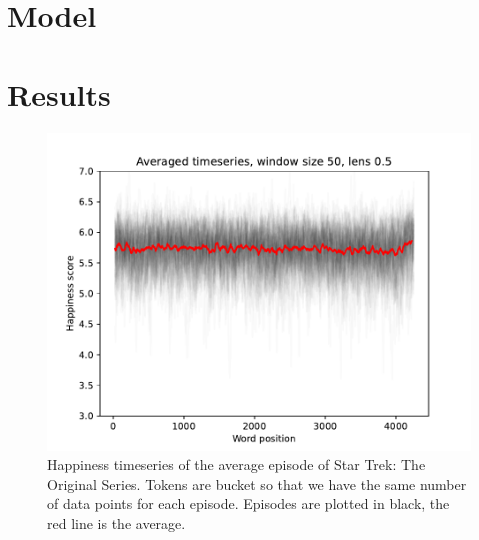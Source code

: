 \section{Model}
\label{sec:startrek_dimensions.model}

\section{Results}
\label{sec:startrek_dimensions.results}


\begin{figure}
    \centering
    \includegraphics[width=\columnwidth]{figures/localized/average_episode_tos.pdf}
    \caption{Happiness timeseries of the average episode of Star Trek: The Original Series. Tokens are bucket so that we have the same number of data points for each episode. Episodes are plotted in black, the red line is the average.}
    \label{fig:average_episode_tos}
\end{figure}

